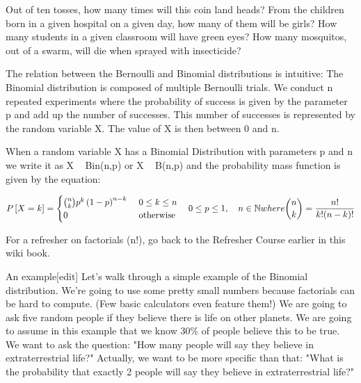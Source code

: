 Out of ten tosses, how many times will this coin land heads?
From the children born in a given hospital on a given day, how many of them will be girls?
How many students in a given classroom will have green eyes?
How many mosquitos, out of a swarm, will die when sprayed with insecticide?




The relation between the Bernoulli and Binomial distributions is intuitive: The Binomial distribution is composed of multiple Bernoulli trials. We conduct n repeated experiments where the probability of success is given by the parameter p and add up the number of successes. This number of successes is represented by the random variable X. The value of X is then between 0 and n.

When a random variable X has a Binomial Distribution with parameters p and n we write it as X ~ Bin(n,p) or X ~ B(n,p) and the probability mass function is given by the equation:

\[P\left[X = k\right] = \begin{cases} {n \choose k} p^k \left(1-p\right)^{n-k}\ & 0 \le k \le n \\ 0 & \mbox{otherwise} \end{cases} \quad 0 \leq p \leq 1, \quad n \in \mathbb{N}
where {n \choose k}={n! \over k!(n-k)!}\]




For a refresher on factorials (n!), go back to the Refresher Course earlier in this wiki book.

An example[edit]
Let's walk through a simple example of the Binomial distribution. We're going to use some pretty small numbers because factorials can be hard to compute. (Few basic calculators even feature them!) We are going to ask five random people if they believe there is life on other planets. We are going to assume in this example that we know 30\% of people believe this to be true. We want to ask the question: "How many people will say they believe in extraterrestrial life?" Actually, we want to be more specific than that: "What is the probability that exactly 2 people will say they believe in extraterrestrial life?"



